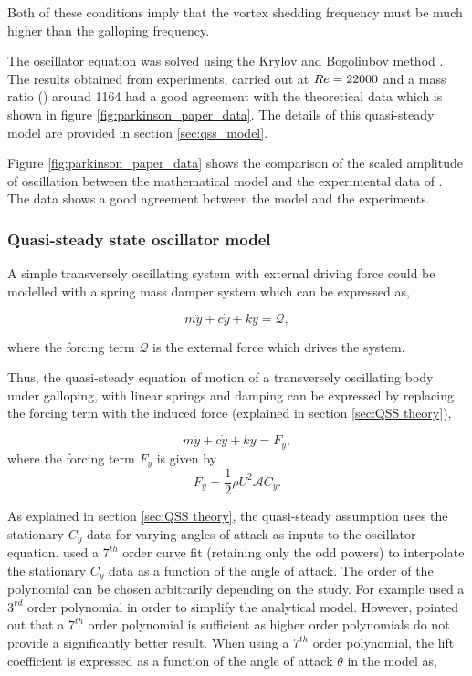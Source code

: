 Both of these conditions imply that the vortex shedding frequency must be much higher than the galloping frequency.

The oscillator equation was solved using the Krylov and Bogoliubov method \citep{Parkinson1964}. The results obtained from experiments, carried out at $Re=22000$ and a mass ratio (\mstar) around 1164 had a good agreement with the theoretical data which is shown in figure \ref{fig:parkinson_paper_data}. The details of this quasi-steady model are provided in section \ref{sec:qss_model}.



Figure \ref{fig:parkinson_paper_data} shows the comparison of the scaled amplitude of oscillation between the mathematical model and the experimental data of \citet{Parkinson1964}. The data shows a good agreement between the model and the experiments.  

\subsubsection*{Quasi-steady state oscillator model}
\label{sec:qss_model}

A simple transversely oscillating system with external driving force could be modelled with a spring mass damper system which can be expressed as,   

\begin{equation}
\label{equationofmotion_1}
m\ddot{y}+c\dot{y}+ky=\mathcal{Q},
\end{equation}

where the forcing term $\mathcal{Q}$ is the external force which drives the system.

Thus, the quasi-steady equation of motion of a transversely oscillating body under galloping, with linear springs and damping can be expressed by replacing the forcing term with the induced force (explained in section \ref{sec:QSS theory}),  

\begin{equation}
\label{equationofmotion}
m\ddot{y}+c\dot{y}+ky=F_y,
\end{equation}
where the forcing term $F_y$ is given by
\begin{equation}
\label{lift equation}
F_y=\frac{1}{2}\rho U^2\mathcal{A}C_y.
\end{equation}

As explained in section \ref{sec:QSS theory}, the quasi-steady assumption uses the stationary $C_y$ data for varying angles of attack as inputs to the oscillator equation. \citet{Parkinson1964} used a $7^{th}$ order curve fit (retaining only the odd powers) to interpolate the stationary $C_y$ data as a function of the angle of attack. The order of the polynomial can be chosen arbitrarily depending on the study. For example \citet{Barrero-Gil2009,Barrero-Gil2010a} used a $3^{rd}$ order polynomial in order to simplify the analytical model. However, \citet{Ng2005} pointed out that a $7^{th}$ order polynomial is sufficient as higher order polynomials do not provide a significantly better result. When using a $7^{th}$ order polynomial, the lift coefficient is expressed as a function of the angle of attack $\theta$ in the model as, 

